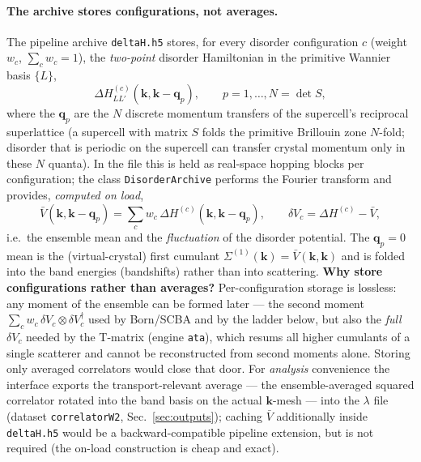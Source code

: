 \documentclass[11pt]{article}
\newcommand{\vk}{\mathbf{k}}
\newcommand{\vq}{\mathbf{q}}
\begin{document}
\paragraph{The archive stores configurations, not averages.}
The pipeline archive \texttt{deltaH.h5} stores, for every disorder
configuration $c$ (weight $w_c$, $\sum_c w_c=1$), the \emph{two-point}
disorder Hamiltonian in the primitive Wannier basis $\{L\}$,
\begin{equation}
\Delta H^{(c)}_{LL'}(\vk,\vk-\vq_p),
\qquad p=1,\dots,N=\det S,
\label{eq:archive}
\end{equation}
where the $\vq_p$ are the $N$ discrete momentum transfers of the
supercell's reciprocal superlattice (a supercell with matrix $S$ folds
the primitive Brillouin zone $N$-fold; disorder that is periodic on the
supercell can transfer crystal momentum only in these $N$ quanta).  In
the file this is held as real-space hopping blocks per configuration;
the class \texttt{DisorderArchive} performs the Fourier transform and
provides, \emph{computed on load},
\begin{equation}
\bar V(\vk,\vk-\vq_p)=\sum_c w_c\,\Delta H^{(c)}(\vk,\vk-\vq_p),
\qquad
\delta V_c=\Delta H^{(c)}-\bar V ,
\label{eq:dV}
\end{equation}
i.e.\ the ensemble mean and the \emph{fluctuation} of the disorder
potential.  The $\vq_p{=}0$ mean is the (virtual-crystal) first cumulant
$\Sigma^{(1)}(\vk)=\bar V(\vk,\vk)$ and is folded into the band energies
(bandshifts) rather than into scattering.  \textbf{Why store
configurations rather than averages?}  Per-configuration storage is
lossless: any moment of the ensemble can be formed later --- the second
moment $\sum_c w_c\,\delta V_c\otimes\delta V_c^\dagger$ used by
Born/SCBA and by the ladder below, but also the \emph{full}
$\delta V_c$ needed by the T-matrix (engine \texttt{ata}), which resums
all higher cumulants of a single scatterer and cannot be reconstructed
from second moments alone.  Storing only averaged correlators would
close that door.  For \emph{analysis} convenience the interface exports
the transport-relevant average --- the ensemble-averaged squared
correlator rotated into the band basis on the actual $\vk$-mesh --- into
the $\lambda$ file (dataset \texttt{correlatorW2},
Sec.~\ref{sec:outputs}); caching $\bar V$ additionally inside
\texttt{deltaH.h5} would be a backward-compatible pipeline extension,
but is not required (the on-load construction is cheap and exact).
\end{document}
